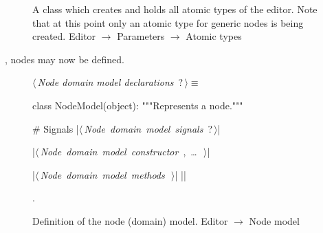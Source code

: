 \documentclass[%
    a4paper,    %
    justified,  %
    nobib,      %
    openany     %
]{tufte-book}
\makeatletter
\renewcommand{\label}[1]{\@tufte@label{##1}}%
\makeatother
\begin{document}
\begin{figure}
\begin{flushleft}
\begin{minipage}{\linewidth}
\begin{list}{}{\setlength{\itemsep}{-\parsep}\setlength{\itemindent}{-\leftmargin}}
\item{}
\end{list}
\end{minipage}\vspace{4ex}
\end{flushleft}
\caption{A class which creates and holds all atomic types of the editor. Note
  that at this point only an atomic type for generic nodes is being created.
  \newline{}\newline{}Editor $\rightarrow$ Parameters $\rightarrow$ Atomic types}
\label{editor:lst:parameters:atomic-types}
\end{figure}

, nodes may now be defined.

\begin{figure}
\begin{flushleft} \small
\begin{minipage}{\linewidth}\label{scrap66}\raggedright\small
{} $\langle\,${\itshape Node domain model declarations}\nobreak\ {\footnotesize {?}}$\,\rangle\equiv$
\vspace{-1ex}
\begin{pythoncode}
class NodeModel(object):
    """Represents a node."""

    # Signals
    |\hbox{$\langle\,${\itshape Node domain model signals}\nobreak\ {\footnotesize ?}$\,\rangle$}|

    |\hbox{$\langle\,${\itshape Node domain model constructor}\nobreak\ {\footnotesize {}, \ldots\ }$\,\rangle$}|

    |\hbox{$\langle\,${\itshape Node domain model methods}\nobreak\ {\footnotesize {}}$\,\rangle$}|
|\NWsep|
\end{pythoncode}
\vspace{1.5ex}
\footnotesize
\begin{list}{}{\setlength{\itemsep}{-\parsep}\setlength{\itemindent}{-\leftmargin}}
\item {\NWtxtMacroNoRef}.

\item{}
\end{list}
\end{minipage}\vspace{4ex}
\end{flushleft}
\caption{Definition of the node (domain) model.
  \newline{}\newline{}Editor $\rightarrow$ Node model}
\label{editor:lst:node-domain-model}
\end{figure}
\end{document}
